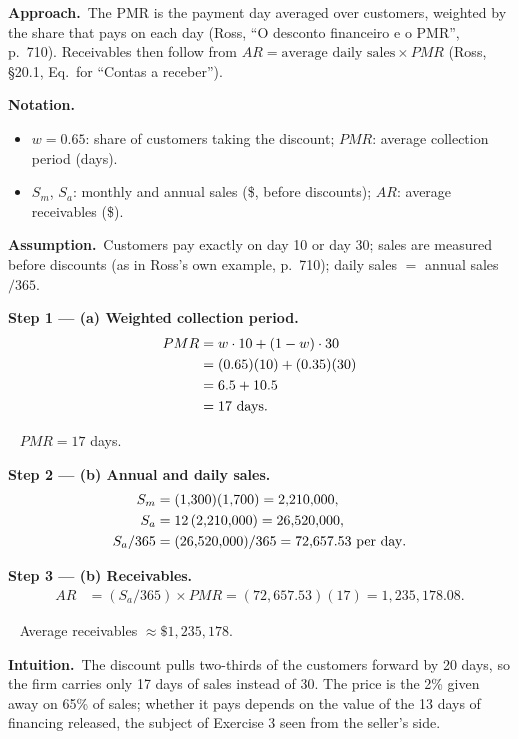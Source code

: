 \documentclass[11pt,a4paper]{article}
\newcommand{\notation}{\par\noindent\textbf{Notation.}}
\newcommand{\step}[2]{\par\medskip\noindent\textbf{Step #1 --- #2.}~}
\newcommand{\intuition}{\par\medskip\noindent\textbf{Intuition.}~}
\newcommand{\assume}{\par\smallskip\noindent\textbf{Assumption.}~}
\newcommand{\approach}{\par\smallskip\noindent\textbf{Approach.}~}
\newcommand{\answer}[1]{\par\smallskip\noindent\fbox{\textbf{Answer #1.}}~}
\begin{document}
\approach The PMR is the payment day averaged over customers, weighted by the share that pays on
each day (Ross, ``O desconto financeiro e o PMR'', p.~710). Receivables then follow from
$AR = \text{average daily sales} \times PMR$ (Ross, \S20.1, Eq.\ for ``Contas a receber'').

\notation
\begin{itemize}
  \item $w = 0.65$: share of customers taking the discount; $PMR$: average collection period (days).
  \item $S_m$, $S_a$: monthly and annual sales (\$, before discounts); $AR$: average receivables (\$).
\end{itemize}
\assume Customers pay exactly on day 10 or day 30; sales are measured before discounts (as in
Ross's own example, p.~710); daily sales $=$ annual sales$/365$.

\step{1}{(a) Weighted collection period}
\begin{align}
  PMR &= w \cdot 10 + (1-w)\cdot 30 \label{r5be4-pmr}\\
  &= (0.65)(10) + (0.35)(30) \notag\\
  &= 6.5 + 10.5 \notag\\
  &= 17 \ \text{days}. \notag
\end{align}

\answer{(a)} $PMR = 17$ days.

\step{2}{(b) Annual and daily sales}
\begin{align}
  S_m &= (1{,}300)(1{,}700) = 2{,}210{,}000, \notag\\
  S_a &= 12\,(2{,}210{,}000) = 26{,}520{,}000, \notag\\
  S_a/365 &= (26{,}520{,}000)/365 = 72{,}657.53 \ \text{per day}. \notag
\end{align}

\step{3}{(b) Receivables}
\begin{align}
  AR &= (S_a/365)\times PMR = (72{,}657.53)(17) = 1{,}235{,}178.08. \label{r5be4-ar}
\end{align}

\answer{(b)} Average receivables $\approx \$1{,}235{,}178$.

\intuition The discount pulls two-thirds of the customers forward by 20 days, so the firm carries
only 17 days of sales instead of 30. The price is the 2\% given away on 65\% of sales; whether it
pays depends on the value of the 13 days of financing released, the subject of Exercise 3 seen
from the seller's side.
\end{document}
